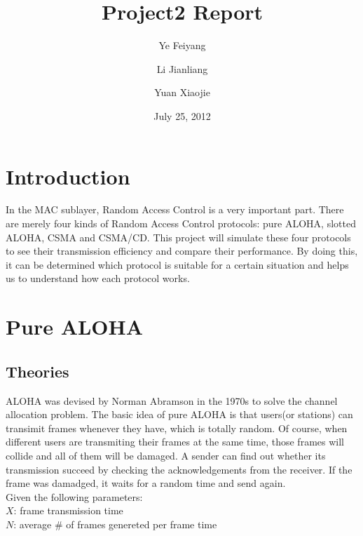 \documentclass[11pt,a4paper]{report}
\begin{document}
\title{Project2 Report}

\author{Ye Feiyang \and Li Jianliang \and Yuan Xiaojie}

\date{July 25, 2012}

\maketitle

\section*{Introduction}

In the MAC sublayer, Random Access Control is a very important part. There are merely four kinds of Random Access Control protocols: pure ALOHA, slotted ALOHA, CSMA and CSMA/CD. This project will simulate these four protocols to see their transmission efficiency and compare their performance. By doing this, it can be determined which protocol is suitable for a certain situation and helps us to understand how each protocol works. \\

\section*{Pure ALOHA}

\subsection*{Theories}

ALOHA was devised by Norman Abramson in the 1970s to solve the channel allocation problem. The basic idea of pure ALOHA is that users(or stations) can transimit frames whenever they have, which is totally random. Of course, when different users are transmiting their frames at the same time, those frames will collide and all of them will be damaged. A sender can find out whether its transmission succeed by checking the acknowledgements from the receiver. If the frame was damadged, it waits for a random time and send again. \\

Given the following parameters: \\

\qquad	\(X\): frame transmission time \\

\qquad	\(N\): average \# of frames genereted per frame time \\
\end{document}
